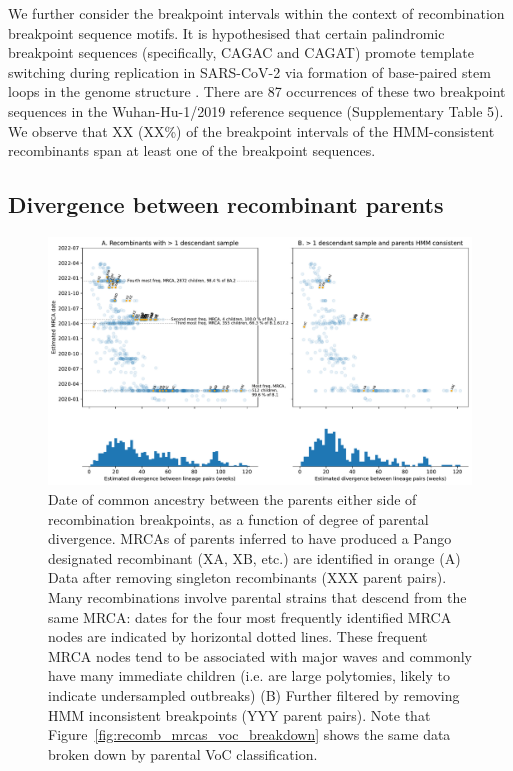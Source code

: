 \documentclass{article}
\begin{document}
We further consider the breakpoint intervals within the context of recombination breakpoint sequence motifs. It is hypothesised that certain palindromic breakpoint sequences (specifically, CAGAC and CAGAT) promote template switching during replication in SARS-CoV-2 via formation of base-paired stem loops in the genome structure \citep{Gallaher2020-lb}. There are 87 occurrences of these two breakpoint sequences in the Wuhan-Hu-1/2019 reference sequence (Supplementary Table 5). We observe that XX (XX\%) of the breakpoint intervals of the HMM-consistent recombinants span at least one of the breakpoint sequences.

\subsection{Divergence between recombinant parents}

\begin{figure} \centering
\includegraphics[width=\textwidth]{figures/recombination_node_mrcas.pdf}
\caption{\label{fig:recomb_mrcas} Date of common ancestry between the parents either side of recombination breakpoints, as a function of degree of parental divergence. MRCAs of parents inferred to have produced a Pango designated recombinant (XA, XB, etc.) are identified in orange (A) Data after removing singleton recombinants (XXX parent pairs). Many recombinations involve parental strains that descend from the same MRCA: dates for the four most frequently identified MRCA nodes are indicated by horizontal dotted lines. These frequent MRCA nodes tend to be associated with major waves and commonly have many immediate children (i.e. are large polytomies, likely to indicate undersampled outbreaks) (B) Further filtered by removing HMM inconsistent breakpoints (YYY parent pairs). Note that Figure~\ref{fig:recomb_mrcas_voc_breakdown} shows the same data broken down by parental VoC classification.}
\end{figure}
\end{document}
